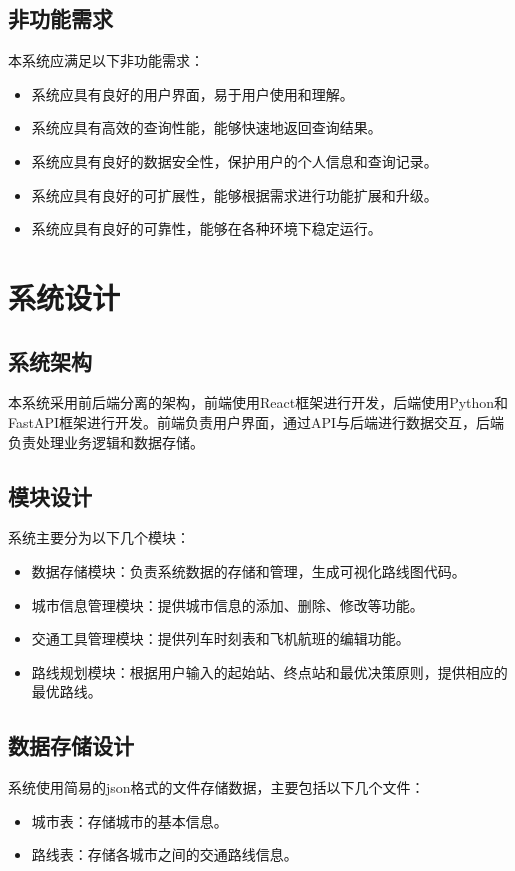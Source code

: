 \documentclass[10pt]{article}
\begin{document}
    \subsection{非功能需求}
    本系统应满足以下非功能需求：

    \begin{itemize}
        \item 系统应具有良好的用户界面，易于用户使用和理解。
        \item 系统应具有高效的查询性能，能够快速地返回查询结果。
        \item 系统应具有良好的数据安全性，保护用户的个人信息和查询记录。
        \item 系统应具有良好的可扩展性，能够根据需求进行功能扩展和升级。
        \item 系统应具有良好的可靠性，能够在各种环境下稳定运行。
    \end{itemize}


    \section{系统设计}

    \subsection{系统架构}
    本系统采用前后端分离的架构，前端使用React框架进行开发，后端使用Python和FastAPI框架进行开发。前端负责用户界面，通过API与后端进行数据交互，后端负责处理业务逻辑和数据存储。

    \subsection{模块设计}
    系统主要分为以下几个模块：
    \begin{itemize}
        \item 数据存储模块：负责系统数据的存储和管理，生成可视化路线图代码。
        \item 城市信息管理模块：提供城市信息的添加、删除、修改等功能。
        \item 交通工具管理模块：提供列车时刻表和飞机航班的编辑功能。
        \item 路线规划模块：根据用户输入的起始站、终点站和最优决策原则，提供相应的最优路线。
    \end{itemize}

    \subsection{数据存储设计}
    系统使用简易的json格式的文件存储数据，主要包括以下几个文件：
    \begin{itemize}
        \item 城市表：存储城市的基本信息。
        \item 路线表：存储各城市之间的交通路线信息。
    \end{itemize}
\end{document}
